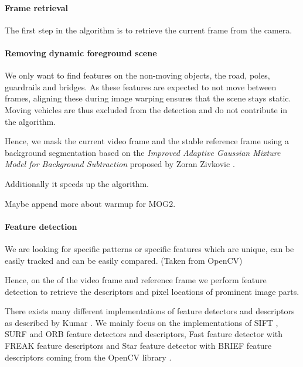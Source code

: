 \paragraph{Frame retrieval}
The first step in the algorithm is to retrieve the current frame from the camera.

\paragraph{Removing dynamic foreground scene}
We only want to find features on the non-moving \Sc{} objects, \eg{} the road, poles, guardrails and bridges. 
As these features are expected to not move between frames, aligning these during image warping ensures that the scene stays static.
Moving vehicles are thus excluded from the detection and do not contribute in the algorithm.

Hence, we mask the current video frame and the stable reference frame using a background segmentation based on
the \emph{Improved Adaptive Gaussian Mixture Model for Background Subtraction} proposed by Zoran Zivkovic \etal{} \cite{zivkovic10.5555/1018428.1020644,zivkovic10.1016/j.patrec.2005.11.005,opencv_library}.

Additionally it speeds up the algorithm. 

Maybe append more about warmup for MOG2.

\paragraph{Feature detection}
We are looking for specific patterns or specific features which are unique, can be easily tracked and can be easily compared. (Taken from OpenCV)

Hence, on the \Sc{} of the video frame and reference frame we perform feature
detection to retrieve the descriptors and pixel locations of prominent image
parts.

There exists many different implementations of feature detectors and descriptors
as described by Kumar \etal{} \cite{kumar2014survey}. We mainly focus on the
implementations of SIFT \cite{lowe10.1023/B:VISI.0000029664.99615.94}, SURF
\cite{bay10.1007/11744023_32} and ORB \cite{rublee6126544} feature detectors and
descriptors, Fast \cite{Ghahremani_2021} feature detector with FREAK \cite{alahi6247715} feature
descriptors and Star \cite{agrawal2008censure} feature detector with BRIEF \cite{calonder10.5555/1888089.1888148} feature descriptors coming from the OpenCV library \cite{opencv_library}. 

